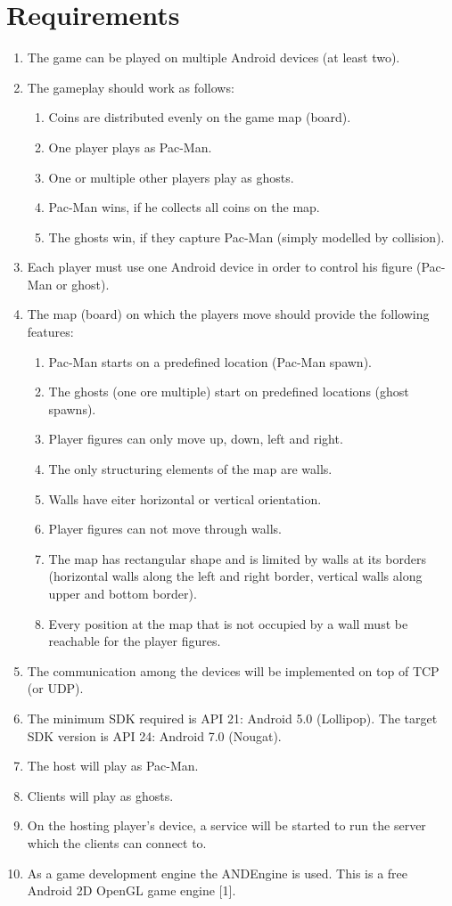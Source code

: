\documentclass{report}
\begin{document}
\section{Requirements}


\begin{enumerate}
	\item The game can be played on multiple Android devices (at least two).
	\item The gameplay should work as follows:
	\begin{enumerate}
		\item Coins are distributed evenly on the game map (board).
		\item One player plays as Pac-Man.
		\item One or multiple other players play as ghosts.
		\item Pac-Man wins, if he collects all coins on the map.
		\item The ghosts win, if they capture Pac-Man (simply modelled by collision).
	\end{enumerate}
	\item Each player must use one Android device in order to control his figure (Pac-Man or ghost).
	\item The map (board) on which the players move should provide the following features:
	\begin{enumerate}
		\item Pac-Man starts on a predefined location (Pac-Man spawn).
		\item The ghosts (one ore multiple) start on predefined locations (ghost spawns).
		\item Player figures can only move up, down, left and right.
		\item The only structuring elements of the map are walls.
		\item Walls have eiter horizontal or vertical orientation.
		\item Player figures can not move through walls.
		\item The map has rectangular shape and is limited by walls at its borders (horizontal walls along the left and right border, vertical walls along upper and bottom border).
		\item Every position at the map that is not occupied by a wall must be reachable for the player figures. 
	\end{enumerate}
	\item The communication among the devices will be implemented on top of TCP (or UDP).
	\item The minimum SDK required is API 21: Android 5.0 (Lollipop). The target SDK version is API 24: Android 7.0 (Nougat).
	\item The host will play as Pac-Man.
	\item Clients will play as ghosts.
	\item On the hosting player's device, a service will be started to run the server which the clients can connect to.
	\item As a game development engine the ANDEngine is used. This is a free Android 2D OpenGL game engine [1].
	

\end{enumerate}
\end{document}
